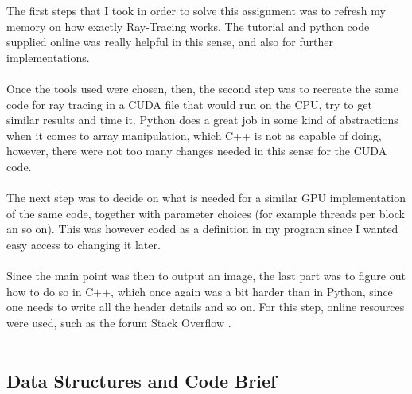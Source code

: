 \documentclass[english]{exam}
\begin{document}
The first steps that I took in order to solve this assignment was to refresh my memory on how exactly Ray-Tracing works. The tutorial and python code supplied online was really helpful in this sense, and also for further implementations.
\\\\
Once the tools used were chosen, then, the second step was to recreate the same code for ray tracing in a CUDA file that would run on the CPU, try to get similar results and time it. Python does a great job in some kind of abstractions when it comes to array manipulation, which C++ is not as capable of doing, however, there were not too many changes needed in this sense for the CUDA code.
\\\\
The next step was to decide on what is needed for a similar GPU implementation of the same code, together with parameter choices (for example threads per block an so on). This was however coded as a definition in my program since I wanted easy access to changing it later.
\\\\
Since the main point was then to output an image, the last part was to figure out how to do so in C++, which once again was a bit harder than in Python, since one needs to write all the header details and so on. For this step, online resources were used, such as the forum Stack Overflow \cite{stack}.
\\\\

\subsection*{Data Structures and Code Brief}
\end{document}

